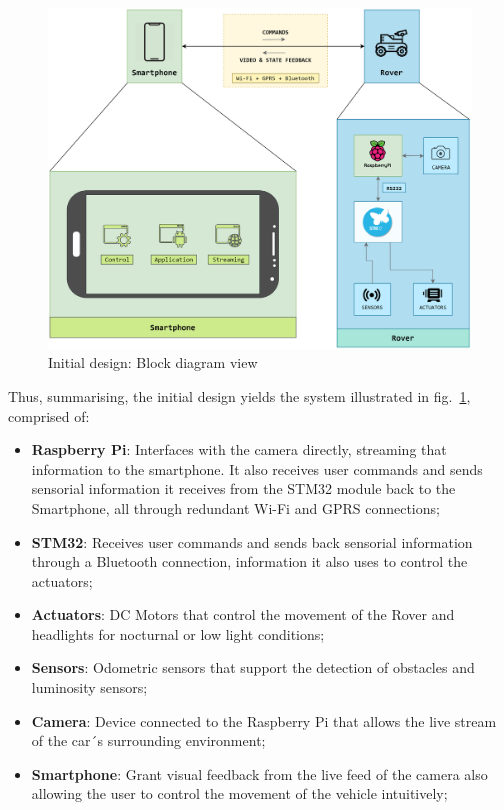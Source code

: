 \begin{figure}[!ht]
\centering
\includegraphics[width=1.0\textwidth]{./sec/img/initial_design_diagram.png}
\caption{\label{fig:initial-design}Initial design: Block diagram view}
\end{figure}

Thus, summarising, the initial design yields the system illustrated in
fig.~\ref{fig:initial-design}, comprised of:

\begin{itemize}
\item \textbf{ Raspberry Pi}: Interfaces with the camera directly, streaming that information to the smartphone. It also receives user commands and sends sensorial information it receives from the STM32 module back to the Smartphone, all through redundant Wi-Fi and GPRS connections;

\item \textbf{STM32}: Receives user commands and sends back sensorial information through a Bluetooth connection, information it also uses to control the actuators;

\item \textbf{Actuators}: DC Motors that control the movement of the Rover and headlights for nocturnal or low light conditions;

\item \textbf{Sensors}: Odometric sensors that support the detection of obstacles and luminosity sensors;

\item \textbf{Camera}: Device connected to the Raspberry Pi that allows the live stream of the car´s surrounding environment;

\item \textbf{Smartphone}: Grant visual feedback from the live feed of the camera also allowing the user to control the movement of the vehicle intuitively;

\end{itemize}

